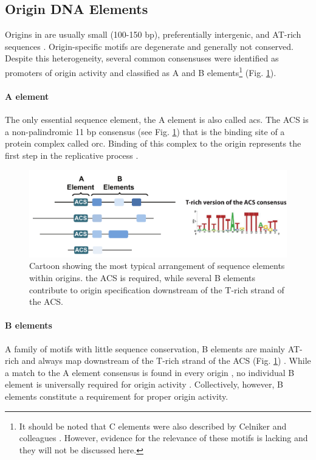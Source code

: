 \subsection{Origin DNA Elements}

Origins in \cer{} are usually small (100-150 bp), preferentially intergenic, and AT-rich sequences \cite{raghuraman:2016:sequence}. 
Origin-specific motifs are degenerate and generally not conserved. Despite this heterogeneity, several common consensuses were identified as promoters of origin activity and classified as A and B elements\footnote{It should be noted that C elements were also described by Celniker and colleagues \cite{celniker:1984:deletion}. However, evidence for the relevance of these motifs \invivo{} is lacking and they will not be discussed here.} (Fig. \ref{fig:originSchemaIntro}).


\paragraph{A element}
The only essential sequence element, the A element is also called \gls{acs}. 
The ACS is a non-palindromic 11 bp consensus (see Fig. \ref{fig:originSchemaIntro}) \cite{celniker:1984:deletion,nieduszynski:2006:genomewide} that is the binding site of a protein complex called \gls{orc}. 
Binding of this complex to the origin represents the first step in the replicative process \cite{diffley:1992:proteindna}.

\begin{figure}[ht]

\centering
\includegraphics[width=\textwidth]{figures/results/acs}
\caption[ACS consensus and arrangement relative to other origin DNA elements]{Cartoon showing the most typical arrangement of sequence elements within origins. the ACS is required, while several B elements contribute to origin specification downstream of the T-rich strand of the ACS.}
\label{fig:originSchemaIntro}

\end{figure}

\paragraph{B elements}
A family of motifs with little sequence conservation, B elements are mainly AT-rich and always map downstream of the T-rich strand of the ACS (Fig. \ref{fig:originSchemaIntro}) \cite{raghuraman:2016:sequence}. 
While a match to the A element consensus is found in every origin \cite{celniker:1984:deletion}, no individual B element is universally required for origin activity \cite{marahrens:1992:yeast,lucas:2003:dynamics}. Collectively, however, B elements constitute a requirement for proper origin activity.


